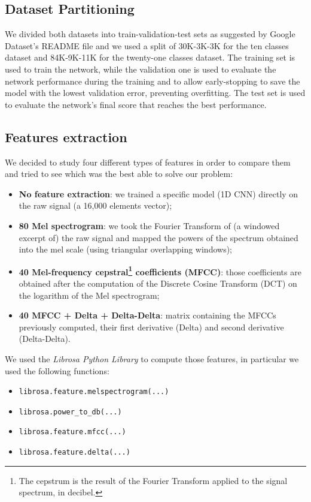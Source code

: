 \documentclass[conference]{IEEEtran}
\begin{document}
\subsection{Dataset Partitioning}
We divided both datasets into train-validation-test sets as suggested by Google Dataset’s README file and we used a split of 30K-3K-3K for the ten classes dataset and 84K-9K-11K for the twenty-one classes dataset. The training set is used to train the network, while the validation one is used to evaluate the network performance during the training and to allow early-stopping to save the model with the lowest validation error, preventing overfitting. The test set is used to evaluate the network’s final score that reaches the best performance.

\subsection{Features extraction}

We decided to study four different types of features in order to compare them and tried to see which was the best able to solve our problem:
\begin{itemize}
\item \textbf{No feature extraction}: we trained a specific model (1D CNN) directly on the raw signal (a 16,000 elements vector);
\item \textbf{80 Mel spectrogram}: we took the Fourier Transform of (a windowed excerpt of) the raw signal and mapped the powers of the spectrum obtained into the mel scale (using triangular overlapping windows);
\item \textbf{40 Mel-frequency cepstral\footnote{The cepstrum is the result of the Fourier Transform applied to the signal spectrum, in decibel.} coefficients (MFCC)}: those coefficients are obtained after the computation of the Discrete Cosine Transform (DCT) on the logarithm of the Mel spectrogram;
\item \textbf{40 MFCC + Delta + Delta-Delta}: matrix containing the MFCCs previously computed, their first derivative (Delta) and second derivative (Delta-Delta).
\end{itemize}
We used the \textit{Librosa Python Library} to compute those features, in particular we used the following functions:
\begin{itemize}
\item \texttt{librosa.feature.melspectrogram(...)}
\item \texttt{librosa.power\_to\_db(...)}
\item \texttt{librosa.feature.mfcc(...)}
\item \texttt{librosa.feature.delta(...)}
\end{itemize}
\end{document}
